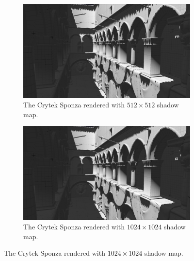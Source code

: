 \begin{figure}
    \centering
    \begin{subfigure}{0.48\textwidth}
		\centering
        \includegraphics[width=\textwidth]{./graf/tests/basic/cropped/sponza_basic_fhd_512.png}
        \caption{The Crytek Sponza rendered with \(512\times 512\) shadow map.}
    \end{subfigure}
	\hfill
    \begin{subfigure}{0.48\textwidth}
		\centering
        \includegraphics[width=\textwidth]{./graf/tests/basic/cropped/sponza_basic_fhd_1024.png}
        \caption{The Crytek Sponza rendered with \(1024\times 1024\) shadow map.}
    \end{subfigure}


\end{figure}
